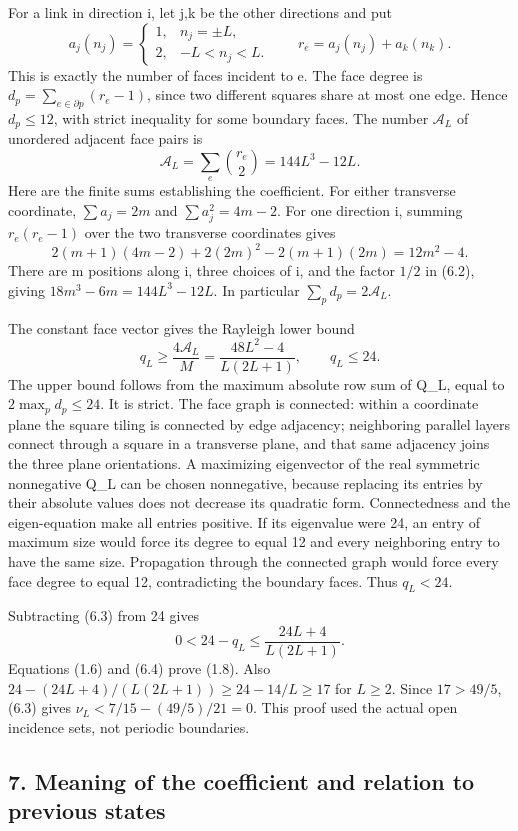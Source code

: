 \documentclass[
  11pt,
]{article}
\begin{document}
For a link in direction i, let j,k be the other directions and put \[
 a_j(n_j)=\begin{cases}1,&n_j=\pm L,\\2,&-L<n_j<L.\end{cases}
 \qquad r_e=a_j(n_j)+a_k(n_k).
\tag{6.1}
\] This is exactly the number of faces incident to e. The face degree is
\(d_p=\sum_{e\in\partial p}(r_e-1)\), since two different squares share
at most one edge. Hence \(d_p\leq12\), with strict inequality for some
boundary faces. The number \(\mathcal A_L\) of unordered adjacent face
pairs is \[
 \mathcal A_L=\sum_e\binom{r_e}{2}=144L^3-12L.
\tag{6.2}
\] Here are the finite sums establishing the coefficient. For either
transverse coordinate, \(\sum a_j=2m\) and \(\sum a_j^2=4m-2\). For one
direction i, summing \(r_e(r_e-1)\) over the two transverse coordinates
gives \[
 2(m+1)(4m-2)+2(2m)^2-2(m+1)(2m)=12m^2-4.
\] There are m positions along i, three choices of i, and the factor
\(1/2\) in (6.2), giving \(18m^3-6m=144L^3-12L\). In particular
\(\sum_pd_p=2\mathcal A_L\).

The constant face vector gives the Rayleigh lower bound \[
 q_L\geq\frac{4\mathcal A_L}{M}
       =\frac{48L^2-4}{L(2L+1)},\qquad q_L\leq24.
\tag{6.3}
\] The upper bound follows from the maximum absolute row sum of Q\_L,
equal to \(2\max_pd_p\leq24\). It is strict. The face graph is
connected: within a coordinate plane the square tiling is connected by
edge adjacency; neighboring parallel layers connect through a square in
a transverse plane, and that same adjacency joins the three plane
orientations. A maximizing eigenvector of the real symmetric nonnegative
Q\_L can be chosen nonnegative, because replacing its entries by their
absolute values does not decrease its quadratic form. Connectedness and
the eigen-equation make all entries positive. If its eigenvalue were 24,
an entry of maximum size would force its degree to equal 12 and every
neighboring entry to have the same size. Propagation through the
connected graph would force every face degree to equal 12, contradicting
the boundary faces. Thus \(q_L<24\).

Subtracting (6.3) from 24 gives \[
 0<24-q_L\leq\frac{24L+4}{L(2L+1)}.
\tag{6.4}
\] Equations (1.6) and (6.4) prove (1.8). Also
\(24-(24L+4)/(L(2L+1))\geq24-14/L\geq17\) for \(L\geq2\). Since
\(17>49/5\), (6.3) gives \(\nu_L<7/15-(49/5)/21=0\). This proof used the
actual open incidence sets, not periodic boundaries.

\subsection{7. Meaning of the coefficient and relation to previous
states}\label{magnetic-part-5-meaning-of-the-coefficient-and-relation-to-previous-states}
\end{document}
